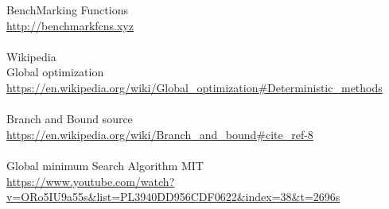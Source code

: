 \documentclass{article}
\begin{document}
\begin{thebibliography}

BenchMarking Functions\\
\url{http://benchmarkfcns.xyz}\\\\

Wikipedia\\Global optimization\\
\url{https://en.wikipedia.org/wiki/Global_optimization#Deterministic_methods}\\\\

Branch and Bound source\\
\url{https://en.wikipedia.org/wiki/Branch_and_bound#cite_ref-8}\\\\

Global minimum Search Algorithm MIT\\
\url{https://www.youtube.com/watch?v=ORo5IU9a55s&list=PL3940DD956CDF0622&index=38&t=2696s}\\\\

\end{thebibliography}
\end{document}

